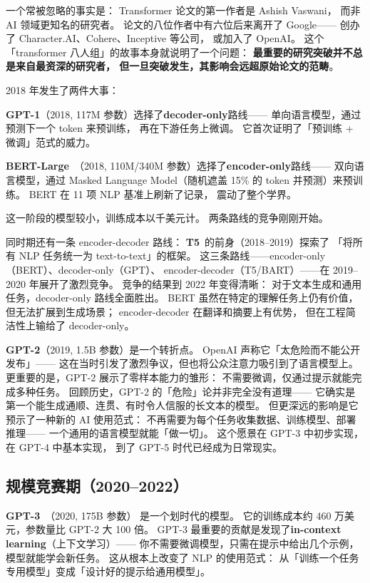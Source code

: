一个常被忽略的事实是：
Transformer 论文的第一作者是 Ashish Vaswani，
而非 AI 领域更知名的研究者。
论文的八位作者中有六位后来离开了 Google——
创办了 Character.AI、Cohere、Inceptive 等公司，
或加入了 OpenAI。
这个「transformer 八人组」的故事本身就说明了一个问题：
\textbf{最重要的研究突破并不总是来自最资深的研究者，
但一旦突破发生，其影响会远超原始论文的范畴}。

2018 年发生了两件大事：

\textbf{GPT-1}（2018, 117M 参数）选择了\textbf{decoder-only}路线——
单向语言模型，通过预测下一个 token 来预训练，
再在下游任务上微调。
它首次证明了「预训练 + 微调」范式的威力。

\textbf{BERT-Large}~\cite{devlin2019bert}（2018, 110M/340M 参数）选择了\textbf{encoder-only}路线——
双向语言模型，通过 Masked Language Model（随机遮盖 15\% 的 token 并预测）来预训练。
BERT 在 11 项 NLP 基准上刷新了记录，
震动了整个学界。

这一阶段的模型较小，训练成本以千美元计。
两条路线的竞争刚刚开始。

同时期还有一条 encoder-decoder 路线：
\textbf{T5}~的前身（2018--2019）探索了
「将所有 NLP 任务统一为 text-to-text」的框架。
这三条路线——encoder-only（BERT）、decoder-only（GPT）、
encoder-decoder（T5/BART）——在 2019--2020 年展开了激烈竞争。
竞争的结果到 2022 年变得清晰：
对于文本生成和通用任务，decoder-only 路线全面胜出。
BERT 虽然在特定的理解任务上仍有价值，
但无法扩展到生成场景；
encoder-decoder 在翻译和摘要上有优势，
但在工程简洁性上输给了 decoder-only。

\textbf{GPT-2}（2019, 1.5B 参数）是一个转折点。
OpenAI 声称它「太危险而不能公开发布」——
这在当时引发了激烈争议，但也将公众注意力吸引到了语言模型上。
更重要的是，GPT-2 展示了零样本能力的雏形：
不需要微调，仅通过提示就能完成多种任务。
回顾历史，GPT-2 的「危险」论并非完全没有道理——
它确实是第一个能生成通顺、连贯、有时令人信服的长文本的模型。
但更深远的影响是它预示了一种新的 AI 使用范式：
不再需要为每个任务收集数据、训练模型、部署推理——
一个通用的语言模型就能「做一切」。
这个愿景在 GPT-3 中初步实现，在 GPT-4 中基本实现，
到了 GPT-5 时代已经成为日常现实。

\subsection{规模竞赛期（2020--2022）}

\textbf{GPT-3}~\cite{brown2020gpt3}（2020, 175B 参数）
是一个划时代的模型。
它的训练成本约 460 万美元，参数量比 GPT-2 大 100 倍。
GPT-3 最重要的贡献是发现了\textbf{in-context learning}（上下文学习）——
你不需要微调模型，只需在提示中给出几个示例，
模型就能学会新任务。
这从根本上改变了 NLP 的使用范式：
从「训练一个任务专用模型」变成「设计好的提示给通用模型」。

